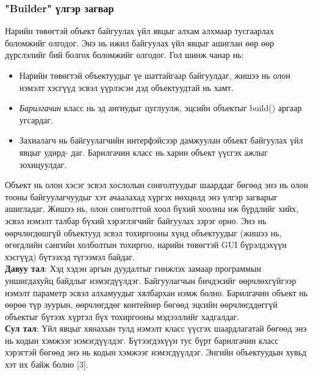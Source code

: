 \subsubsection{"Builder" үлгэр загвар}
\quad \quad Нарийн төвөгтэй объект байгуулах үйл явцыг алхам алхмаар тусгаарлах боломжийг олгодог. Энэ нь ижил байгуулах үйл явцыг ашиглан өөр өөр дүрслэлийг бий болгох боломжийг олгодог. Гол шинж чанар нь:
\begin{itemize}
	\item Нарийн төвөгтэй объектуудыг үе шаттайгаар байгуулдаг, жишээ нь олон нэмэлт хэсгүүд эсвэл үүрлэсэн дэд объектуудтай нь хамт.
	\item \textit{Барилгачин} класс нь эд ангиудыг цуглуулж, эцсийн объектыг build() аргаар угсардаг.
	\item Захиалагч нь байгуулагчийн интерфэйсээр дамжуулан объект байгуулах үйл явцыг удирд- даг. Барилгачин класс нь харин объект үүсгэх ажлыг зохицуулдаг.
\end{itemize}
Объект нь олон хэсэг эсвэл хослолын сонголтуудыг шаарддаг бөгөөд энэ нь олон тооны байгуулагчуудыг хэт ачаалахад хүргэх нөхцөлд энэ үлгэр загварыг ашигладаг. Жишээ нь, олон сонголттой хоол бүхий хоолны иж бүрдлийг хийх, эсвэл нэмэлт талбар бүхий хэрэглэгчийг байгуулах зэрэг орно. Энэ нь өөрчлөгдөшгүй объектууд эсвэл тохиргооны хүнд объектуудыг (жишээ нь, өгөгдлийн сангийн холболтын тохиргоо, нарийн төвөгтэй GUI бүрэлдэхүүн хэсгүүд) бүтээхэд түгээмэл байдаг.\\
\textbf{Давуу тал}: Хэд хэдэн аргын дуудалтыг гинжлэх замаар программын уншигдахуйц байдлыг нэмэгдүүлдэг. Байгуулагчын бичдэсийг өөрчлөхгүйгээр нэмэлт параметр эсвэл алхамуудыг хялбархан нэмж болно. Барилгачин объект нь өөрөө түр зуурын, өөрчлөгддөг контейнер бөгөөд эцсийн өөрчлөгддөггүй объектыг бүтээх хүртэл бүх тохиргооны мэдээллийг хадгалдаг.\\
\textbf{Сул тал}: Үйл явцыг хянахын тулд нэмэлт класс үүсгэх шаардлагатай бөгөөд энэ нь кодын хэмжээг нэмэгдүүлдэг.	Бүтээгдэхүүн тус бүрт барилгачин класс хэрэгтэй бөгөөд энэ нь кодын хэмжээг нэмэгдүүлдэг. Энгийн объектуудын хувьд хэт их байж болно [3].

